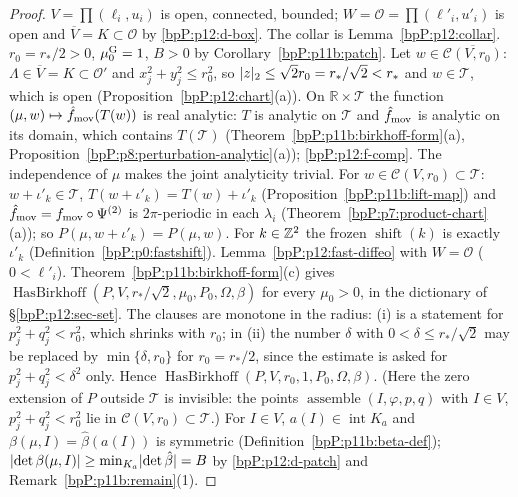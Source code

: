 \begin{proof}
\label{stepP:p12:pg-sets} $V=\prod(\ell_i,u_i)$ is open, connected, bounded; $W=\mathcal O=\prod(\ell'_i,u'_i)$ is open and $\overline V=K\subset\mathcal O$ by \ref{bpP:p12:d-box}. The collar is Lemma~\ref{bpP:p12:collar}. $r_0=r_*/2>0$, $\mu_0^{\rm G}=1$, $B>0$ by Corollary~\ref{bpP:p11b:patch}.
\label{stepP:p12:pg-h1} Let $w\in\overline{\mathcal C(V,r_0)}$: $\Lambda\in\overline V=K\subset\mathcal O'$ and $x_j^2+y_j^2\le r_0^2$, so $\lvert z\rvert_2\le\sqrt2r_0=r_*/\sqrt2<r_*$ and $w\in\mathcal T$, which is open (Proposition~\ref{bpP:p12:chart}(a)). On $\mathbb R\times\mathcal T$ the function $(\mu,w)\mapsto\hat f_{\rm mov}(T(w))$ is real analytic: $T$ is analytic on $\mathcal T$ and $\hat f_{\rm mov}$ is analytic on its domain, which contains $T(\mathcal T)$ (Theorem~\ref{bpP:p11b:birkhoff-form}(a), Proposition~\ref{bpP:p8:perturbation-analytic}(a)); \ref{bpP:p12:f-comp}. The independence of $\mu$ makes the joint analyticity trivial.
\label{stepP:p12:pg-h2} For $w\in\mathcal C(V,r_0)\subset\mathcal T$: $w+\iota'_k\in\mathcal T$, $T(w+\iota'_k)=T(w)+\iota'_k$ (Proposition~\ref{bpP:p11b:lift-map}) and $\hat f_{\rm mov}=f_{\rm mov}\circ\Psi^{(2)}$ is $2\pi$-periodic in each $\lambda_i$ (Theorem~\ref{bpP:p7:product-chart}(a)); so $P(\mu,w+\iota'_k)=P(\mu,w)$. For $k\in\mathbb{Z}^2$ the frozen $\operatorname{shift}(k)$ is exactly $\iota'_k$ (Definition~\ref{bpP:p0:fastshift}).
\label{stepP:p12:pg-h3} Lemma~\ref{bpP:p12:fast-diffeo} with $W=\mathcal O$ ($0<\ell'_i$).
\label{stepP:p12:pg-h4} Theorem~\ref{bpP:p11b:birkhoff-form}(c) gives $\operatorname{HasBirkhoff}(P,V,r_*/\sqrt2,\mu_0,P_0,\Omega,\beta)$ for every $\mu_0>0$, in the dictionary of \S\ref{bpP:p12:sec-set}. The clauses are monotone in the radius: (i) is a statement for $p_j^2+q_j^2<r_0^2$, which shrinks with $r_0$; in (ii) the number $\delta$ with $0<\delta\le r_*/\sqrt2$ may be replaced by $\min\{\delta,r_0\}$ for $r_0=r_*/2$, since the estimate is asked for $p_j^2+q_j^2<\delta^2$ only. Hence $\operatorname{HasBirkhoff}(P,V,r_0,1,P_0,\Omega,\beta)$. (Here the zero extension of $P$ outside $\mathcal T$ is invisible: the points $\operatorname{assemble}(I,\varphi,p,q)$ with $I\in V$, $p_j^2+q_j^2<r_0^2$ lie in $\mathcal C(V,r_0)\subset\mathcal T$.)
\label{stepP:p12:pg-h56} For $I\in V$, $a(I)\in\operatorname{int}K_a$ and $\beta(\mu,I)=\hat\beta(a(I))$ is symmetric (Definition~\ref{bpP:p11b:beta-def}); $\lvert \det\beta(\mu,I)\rvert\ge\min_{K_a}\lvert \det\hat\beta\rvert=B$ by \ref{bpP:p12:d-patch} and Remark~\ref{bpP:p11b:remain}(1).
\end{proof}

